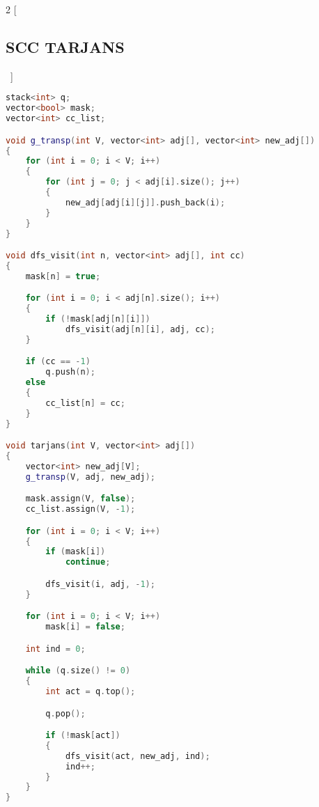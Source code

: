 \documentclass[leter]{amsart}
\begin{document}
\begin{multicols}{2}
[\subsection{SCC TARJANS}\ ]
\begin{lstlisting}[language=C++]
stack<int> q;
vector<bool> mask;
vector<int> cc_list;

void g_transp(int V, vector<int> adj[], vector<int> new_adj[])
{
    for (int i = 0; i < V; i++)
    {
        for (int j = 0; j < adj[i].size(); j++)
        {
            new_adj[adj[i][j]].push_back(i);
        }
    }
}

void dfs_visit(int n, vector<int> adj[], int cc)
{
    mask[n] = true;

    for (int i = 0; i < adj[n].size(); i++)
    {
        if (!mask[adj[n][i]])
            dfs_visit(adj[n][i], adj, cc);
    }

    if (cc == -1)
        q.push(n);
    else
    {
        cc_list[n] = cc;
    }
}

void tarjans(int V, vector<int> adj[])
{
    vector<int> new_adj[V];
    g_transp(V, adj, new_adj);

    mask.assign(V, false);
    cc_list.assign(V, -1);

    for (int i = 0; i < V; i++)
    {
        if (mask[i])
            continue;

        dfs_visit(i, adj, -1);
    }

    for (int i = 0; i < V; i++)
        mask[i] = false;

    int ind = 0;

    while (q.size() != 0)
    {
        int act = q.top();

        q.pop();

        if (!mask[act])
        {
            dfs_visit(act, new_adj, ind);
            ind++;
        }
    }
}

\end{lstlisting}
\end{multicols}
\end{document}
